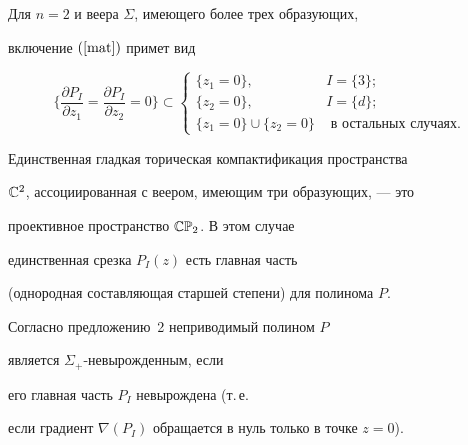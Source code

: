 \begin{note}


Для $n=2$ и веера $\Sigma$, имеющего более трех образующих,


включение $(\ref{mat})$ примет вид


$$


\bigg\{ \frac{\partial P_I}{\partial z_1} =


\frac{\partial P_I}{\partial z_2} =0 \bigg\} \subset


\begin{cases}


\{z_1=0\}, & I=\{3\}; \\


\{z_2=0\}, & I=\{d\}; \\


\{z_1=0\}\cup\{z_2=0\} &


\text{ в остальных случаях}.


\end{cases}


$$


Единственная гладкая торическая компактификация пространства


$\Bbb C^2$, ассоциированная с веером, имеющим три образующих, --- это


проективное пространство $\Bbb{CP}_2$. В этом случае


единственная срезка $P_I(z)$ есть главная часть


(однородная составляющая старшей степени) для полинома $P$.


Согласно предложению~2 неприводимый полином $P$


является $\Sigma_+$-невырожденным, если


его главная часть $P_I$ невырождена (т.\,е.


если градиент $\nabla(P_I)$ обращается в нуль только в точке $z=0$).


\end{note}





